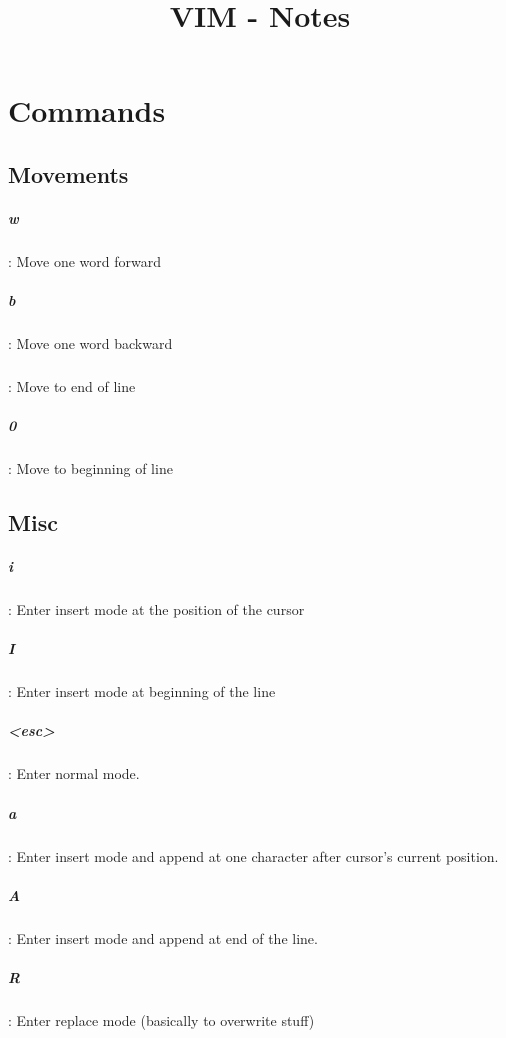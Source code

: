 \documentclass[10pt,letterpaper]{book}
\begin{document}
\title{VIM - Notes}
\tableofcontents
\chapter{Commands}
\section{Movements}
\paragraph{w}: Move one word forward
\paragraph{b}: Move one word backward
\paragraph{\textdollar}: Move to end of line
\paragraph{0}: Move to beginning of line
\section{Misc}
\paragraph{i}: Enter insert mode at the position of the cursor
\paragraph{I}: Enter insert mode at beginning of the line
\paragraph{<esc>}: Enter normal mode.
\paragraph{a}: Enter insert mode and append at one character after cursor's current position.
\paragraph{A}: Enter insert mode and append at end of the line.
\paragraph{R}: Enter replace mode (basically to overwrite stuff)
\end{document}
